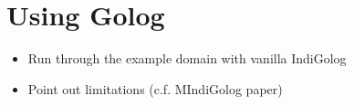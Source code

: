\chapter{Using Golog}\label{ch:golog}

\begin{itemize}
\item Run through the example domain with vanilla IndiGolog
\item Point out limitations (c.f. MIndiGolog paper)
\end{itemize}

